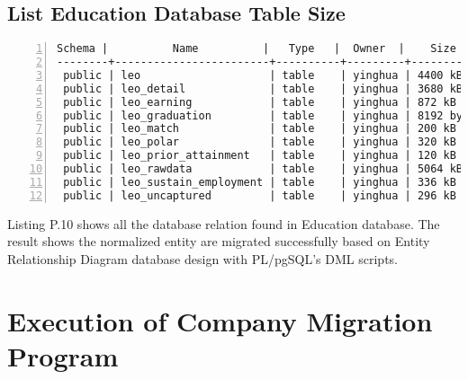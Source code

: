 \subsection{List Education Database Table Size}
\lstset{basicstyle=\ttfamily\tiny}  
\begin{lstlisting}[breaklines, frame=single, numbers=left, caption={List size of Education normalized table.}, label=commandline-02]
 Schema |          Name          |   Type   |  Owner  |    Size    | Line Counts 
--------+------------------------+----------+---------+------------+-------------
 public | leo                    | table    | yinghua | 4400 kB    | 32706
 public | leo_detail             | table    | yinghua | 3680 kB    | 32706
 public | leo_earning            | table    | yinghua | 872 kB     | 14372
 public | leo_graduation         | table    | yinghua | 8192 bytes | 195
 public | leo_match              | table    | yinghua | 200 kB     | 3992
 public | leo_polar              | table    | yinghua | 320 kB     | 6793
 public | leo_prior_attainment   | table    | yinghua | 120 kB     | 2139
 public | leo_rawdata            | table    | yinghua | 5064 kB    | 32706
 public | leo_sustain_employment | table    | yinghua | 336 kB     | 6192
 public | leo_uncaptured         | table    | yinghua | 296 kB     | 6283

\end{lstlisting}

Listing P.10 shows all the database relation found in Education database. The result shows the normalized entity are migrated successfully based on Entity Relationship Diagram database design with PL/pgSQL's DML scripts.

\newpage 

\section{Execution of Company Migration Program}

